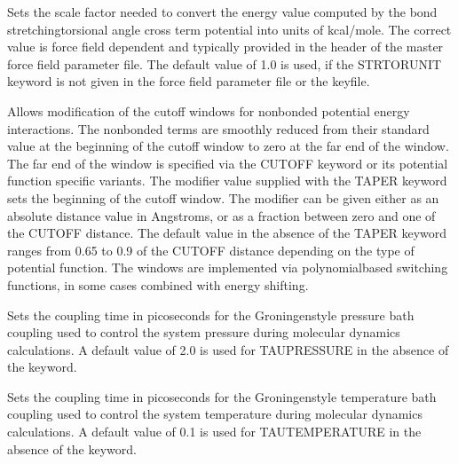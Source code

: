 \documentclass[letterpaper,11pt,english]{sphinxmanual}
\begin{document}
  Sets the scale factor needed to convert the energy value computed by the bond stretching\sphinxhyphen{}torsional angle cross term potential into units of kcal/mole. The correct value is force field dependent and typically provided in the header of the master force field parameter file. The default value of 1.0 is used, if the STRTORUNIT keyword is not given in the force field parameter file or the keyfile.



  Allows modification of the cutoff windows for nonbonded potential energy interactions. The nonbonded terms are smoothly reduced from their standard value at the beginning of the cutoff window to zero at the far end of the window. The far end of the window is specified via the CUTOFF keyword or its potential function specific variants. The modifier value supplied with the TAPER keyword sets the beginning of the cutoff window. The modifier can be given either as an absolute distance value in Angstroms, or as a fraction between zero and one of the CUTOFF distance. The default value in the absence of the TAPER keyword ranges from 0.65 to 0.9 of the CUTOFF distance depending on the type of potential function. The windows are implemented via polynomial\sphinxhyphen{}based switching functions, in some cases combined with energy shifting.



  Sets the coupling time in picoseconds for the Groningen\sphinxhyphen{}style pressure bath coupling used to control the system pressure during molecular dynamics calculations. A default value of 2.0 is used for TAU\sphinxhyphen{}PRESSURE in the absence of the keyword.

  Sets the coupling time in picoseconds for the Groningen\sphinxhyphen{}style temperature bath coupling used to control the system temperature during molecular dynamics calculations. A default value of 0.1 is used for TAU\sphinxhyphen{}TEMPERATURE in the absence of the keyword.


\end{document}
